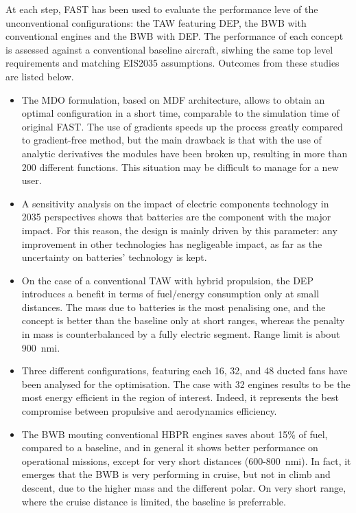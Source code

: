 At each step, FAST has been used to evaluate the performance leve of the unconventional configurations: the TAW featuring DEP, the BWB with conventional engines and the BWB with DEP. 
The performance of each concept is assessed against a conventional baseline aircraft, siwhing the same top level requirements and matching EIS2035 assumptions. 
Outcomes from these studies are listed below.
\begin{itemize}
	\item The MDO formulation, based on MDF architecture, allows to obtain an optimal configuration in a short time, comparable to the simulation time of original FAST. 
	The use of gradients speeds up the process greatly compared to gradient-free method, but the main drawback is that with the use of analytic derivatives the modules have been broken up, resulting in more than 200 different functions. 
	This situation may be difficult to manage for a new user. 
	
	\item A sensitivity analysis on the impact of electric components technology in 2035 perspectives shows that batteries are the component with the major impact. 
	For this reason, the design is mainly driven by this parameter: any improvement in other technologies has negligeable impact, as far as the uncertainty on batteries' technology is kept.
	
	\item On the case of a conventional TAW with hybrid propulsion, the DEP introduces a benefit in terms of fuel/energy consumption only at small distances. 
	The mass due to batteries is the most penalising one, and the concept is better than the baseline only at short ranges, whereas the penalty in mass is counterbalanced by a fully electric segment. 
	Range limit is about 900~nmi.
	
	\item Three different configurations, featuring each 16, 32, and 48 ducted fans have been analysed for the optimisation. 
	The case with 32 engines results to be the most energy efficient in the region of interest.
	Indeed, it represents the best compromise between propulsive and aerodynamics efficiency. 
	
	\item The BWB mouting conventional HBPR engines saves about 15\% of fuel, compared to a baseline, and in general it shows better performance on operational missions, except for very short distances (600-800~nmi).
	In fact, it emerges that the BWB is very performing in cruise, but not in climb and descent, due to the higher mass and the different polar. 
	On very short range, where the cruise distance is limited, the baseline is preferrable. 
	

\end{itemize}
